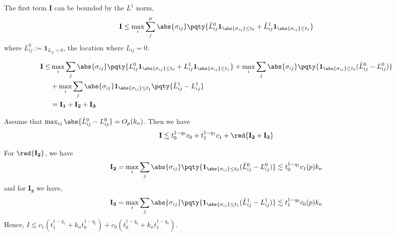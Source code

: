 \documentclass[12pt]{article}
\newcommand{\indicator}[1]{\mathbf{1}_{#1}}
\newcommand{\itm}[1]{\mathbf{#1}}
\begin{document}
        The first term \(\itm{I}\) can be bounded by the \(L^{1}\) norm, 
        \begin{equation*}
            \itm{I} \leq \max_{i} \sum_{j}^{p} \abs{\sigma_{ij}} \pqty{\hat{L}_{ij}^{0} \indicator{\abs{\sigma_{ij}} \leq t_{0}} + \hat{L}_{ij}^{1} \indicator{\abs{\sigma_{ij}} \leq t_{1}}}
        \end{equation*}
        where \(L_{ij}^{0} := \indicator{L_{ij} = 0}\), the location where \(L_{ij} = 0\).  
        
        \begin{align*}
            \itm{I} \leq &\max_{i} \sum_{j} \abs{\sigma_{ij}} \pqty{{L}_{ij}^{0} \indicator{\abs{\sigma_{ij}} \leq t_{0}} + {L}_{ij}^{1} \indicator{\abs{\sigma_{ij}} \leq t_{1}}} + \max_{i}\sum_{j} \abs{\sigma_{ij}} \pqty{\indicator{\abs{\sigma_{ij}}\leq t_{0}} (\hat{L}_{ij}^{0} - L_{ij}^{0})} \\
            &+ \max_{i}\sum_{j} \abs{\sigma_{ij}} \indicator{\abs{\sigma_{ij}} \leq t_{1}} \pqty{\hat{L}_{ij}^{1} - L_{ij}^{1}} \\
            &= \itm{I_{1}} + \itm{I_{2}} + \itm{I_{3}}
        \end{align*}

        Assume that \(\max_{ij} \abs{\hat{L}_{ij}^{0} - L_{ij}^{0}} = O_{p}(k_{n})\). 
        Then we have 
        \begin{equation*}
            \itm{I} \lesssim t_{0}^{1-q_{0}} c_{0} + t_{1}^{1-q_{1}} c_{1} + \red{\itm{I_{2}} + \itm{I_{3}}} 
        \end{equation*}
        
        For \(\red{\itm{I_{2}}}\), we have  
        \begin{equation*}
            \itm{I_{2}} = \max_{i} \sum_{j} \abs{\sigma_{ij}} \pqty{\indicator{\abs{\sigma_{ij}} \leq t_{0}} (\hat{L}_{ij}^{0} - L_{ij}^{0}) } \lesssim t_{0}^{1-q_{1}} c_{1}(p) k_{n}   
        \end{equation*}
        and for \(\itm{I_{3}}\) we have, 
        \begin{equation*}
            \itm{I_{3}} = \max_{i} \sum_{j} \abs{\sigma_{ij}} \pqty{\indicator{\abs{\sigma_{ij}}\leq t_{1}} (\hat{L}_{ij}^{1} - L_{ij}^{1})} \lesssim t_{1}^{1-q_{0}} c_{0}(p) k_{n}    
        \end{equation*}
        Hence, \(I \lesssim c_{1} (t_{1}^{1 - q_{1}} + k_{n} t_{0}^{1-q_{1}}) + c_{0} (t_{0}^{1-q_{0}} + k_{n} t_{1}^{1-q_{0}})\).
\end{document}
